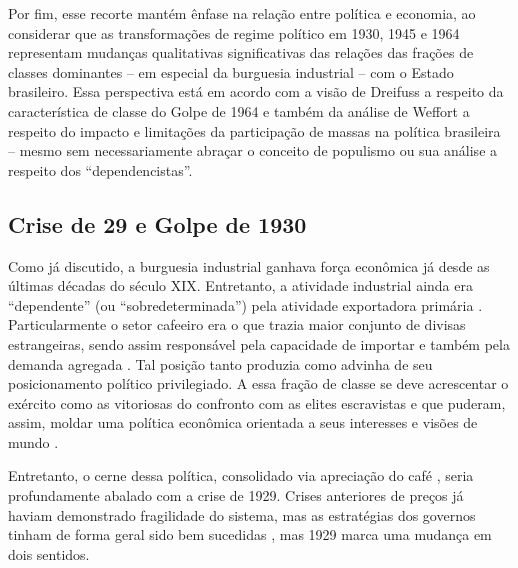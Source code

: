 Por fim, esse recorte mantém ênfase na relação entre política e
economia, ao considerar que as transformações de regime político em
1930, 1945 e 1964 representam mudanças qualitativas significativas das
relações das frações de classes dominantes -- em especial da burguesia
industrial -- com o Estado brasileiro. Essa perspectiva está em acordo
com a visão de Dreifuss \citep{dreifuss1964ConquistaEstado} a respeito da característica de classe
do Golpe de 1964 e também da análise de Weffort \citep{weffortPopulismoNaPolitica2003} a respeito do impacto 
e limitações da participação de massas na política brasileira -- mesmo sem
necessariamente abraçar o conceito de populismo ou sua análise a respeito dos
``dependencistas''.

\subsection{Crise de 29 e Golpe de 1930}

Como já discutido, a burguesia industrial ganhava força econômica já
desde as últimas décadas do século XIX. Entretanto, a atividade
industrial ainda era ``dependente'' (ou ``sobredeterminada'') pela atividade
exportadora primária \citep{pradojunior2012}.
Particularmente o setor cafeeiro era o
que trazia maior conjunto de divisas estrangeiras, sendo assim
responsável pela capacidade de importar e também pela demanda agregada
\citep{pradojunior2012}. Tal posição tanto produzia como advinha de seu
posicionamento político privilegiado. A essa fração de classe se deve
acrescentar o exército como as vitoriosas do confronto com as elites
escravistas e que puderam, assim, moldar uma política econômica orientada
a seus interesses e visões de mundo \citep{furtado_formacao_2005,pradojunior2012}.

Entretanto, o cerne dessa política, consolidado via apreciação do café
\citep{pradojunior2012}, seria profundamente abalado com a crise de 1929. Crises
anteriores de preços já haviam demonstrado fragilidade do sistema, mas
as estratégias dos governos tinham de forma geral sido bem sucedidas
\citep{jr_historia_2021}, mas 1929 marca uma mudança em dois sentidos.

